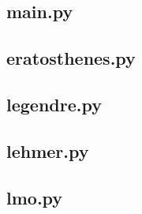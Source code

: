 \subsection{main.py}

\subsection{eratosthenes.py}

\subsection{legendre.py}

\subsection{lehmer.py}

\subsection{lmo.py}
































%


%
